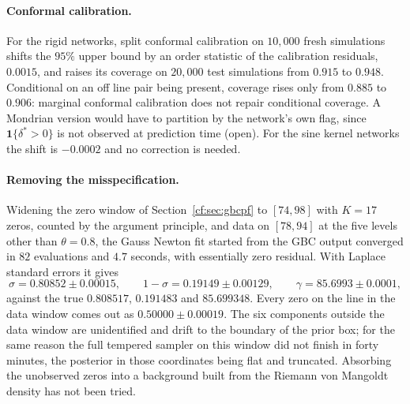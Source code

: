 \paragraph{Conformal calibration.} For the rigid networks, split conformal calibration on $10{,}000$ fresh simulations shifts the $95\%$ upper bound by an order statistic of the calibration residuals, $0.0015$, and raises its coverage on $20{,}000$ test simulations from $0.915$ to $0.948$. Conditional on an off line pair being present, coverage rises only from $0.885$ to $0.906$: marginal conformal calibration does not repair conditional coverage. A Mondrian version would have to partition by the network's own flag, since $\mathbf 1\{\delta^\ast>0\}$ is not observed at prediction time (open). For the sine kernel networks the shift is $-0.0002$ and no correction is needed.

\paragraph{Removing the misspecification.} Widening the zero window of Section~\ref{cf:sec:gbcpf} to $[74,98]$ with $K=17$ zeros, counted by the argument principle, and data on $[78,94]$ at the five levels other than $\theta=0.8$, the Gauss Newton fit started from the GBC output converged in $82$ evaluations and $4.7$ seconds, with essentially zero residual. With Laplace standard errors it gives
\[
\sigma=0.80852\pm0.00015,\qquad 1-\sigma=0.19149\pm0.00129,\qquad \gamma=85.6993\pm0.0001,
\]
against the true $0.808517$, $0.191483$ and $85.699348$. Every zero on the line in the data window comes out as $0.50000\pm0.00019$. The six components outside the data window are unidentified and drift to the boundary of the prior box; for the same reason the full tempered sampler on this window did not finish in forty minutes, the posterior in those coordinates being flat and truncated. Absorbing the unobserved zeros into a background built from the Riemann von Mangoldt density has not been tried.
